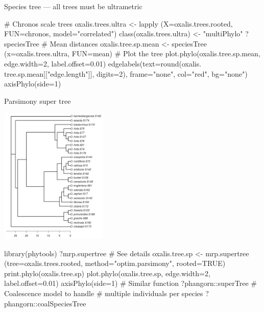 \documentclass[compress, ucs, xelatex, 11pt, xcolor=svgnames, aspectratio=169,
	hyperref={
		bookmarks=true,
		unicode=true,
		colorlinks=true,
		pdftitle={Molecular data in R},
		plainpages=false,
		pdfauthor={Vojtech Zeisek},
		pdfsubject={Course about phylogeny and evolution in R},
		pdfcreator={XeLaTeX},
		pdfkeywords={R, evolution, phylogeny, molecular data},
		linkcolor=Crimson, %
		anchorcolor=Magenta, %
		citecolor=Magenta, %
		filecolor=Magenta, %
		menucolor=Magenta, %
		urlcolor=DodgerBlue, %
		pdftex},
	url={hyphens, lowtilde} %
	]{beamer}
\renewcommand{\texttt}[1]{\colorbox{Beige}{{\ttfamily #1}}}
\begin{document}
\begin{frame}[fragile]{Species tree --- all trees must be ultrametric}
	\begin{multicols}{2}
		\begin{center}
			\texttt{[image: oxalis-sp.png]}
		\end{center}
		\begin{spluscode}
    # Chronos scale trees
    oxalis.trees.ultra <- lapply
      (X=oxalis.trees.rooted,
      FUN=chronos, model="correlated")
    class(oxalis.trees.ultra) <-
      "multiPhylo"
    ?speciesTree # Mean distances
    oxalis.tree.sp.mean <- speciesTree
      (x=oxalis.trees.ultra, FUN=mean)
    # Plot the tree
    plot.phylo(oxalis.tree.sp.mean,
      edge.width=2, label.offset=0.01)
    edgelabels(text=round(oxalis.
      tree.sp.mean[["edge.length"]],
      digits=2), frame="none",
      col="red", bg="none")
    axisPhylo(side=1)
		\end{spluscode}
	\end{multicols}
	\end{frame}

\begin{frame}[fragile]{Parsimony super tree}
	\begin{multicols}{2}
		\begin{center}
			\includegraphics[height=6.5cm]{oxalis-pars.png}
		\end{center}
		\begin{spluscode}
    library(phytools)
    ?mrp.supertree # See details
    oxalis.tree.sp <- mrp.supertree
      (tree=oxalis.trees.rooted,
      method="optim.parsimony",
      rooted=TRUE)
    print.phylo(oxalis.tree.sp)
    plot.phylo(oxalis.tree.sp,
      edge.width=2, label.offset=0.01)
    axisPhylo(side=1)
    # Similar function
    ?phangorn::superTree
    # Coalescence model to handle
    # multiple individuals per species
    ?phangorn::coalSpeciesTree
		\end{spluscode}
	\end{multicols}
\end{frame}
\end{document}
